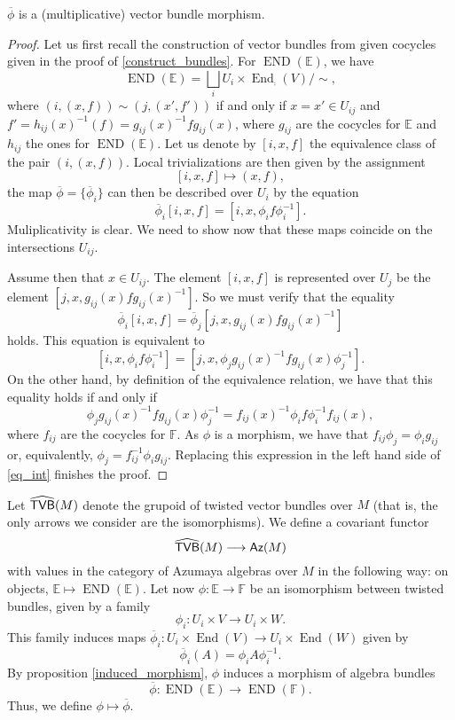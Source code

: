\begin{proposition}\label{induced_morphism}
$\overline{\phi}$ is a (multiplicative) vector bundle morphism.
\end{proposition}
\begin{proof}
Let us first recall the construction of vector bundles from given cocycles given in the proof of \ref{construct_bundles}. For $\operatorname{END}(\mathbb{E})$, we have
$$\operatorname{END}(\mathbb{E})=\bigsqcup_iU_i\times \operatorname{End}_{\comp}(V)/\sim ,$$
where $(i,(x,f))\sim (j,(x',f'))$ if and only if $x=x'\in U_{ij}$ and $f'=h_{ij}(x)^{-1}(f)=g_{ij}(x)^{-1}fg_{ij}(x)$, where $g_{ij}$ are the cocycles for $\mathbb{E}$ and $h_{ij}$ the ones for $\operatorname{END}(\mathbb{E})$. Let us denote by $[i,x,f]$ the equivalence class of the pair $(i,(x,f))$. Local trivializations are then given by the assignment
$$[i,x,f]\longmapsto (x,f),$$
the map $\overline{\phi}=\{\overline{\phi}_i\}$ can then be described over $U_i$ by the equation
$$\overline{\phi}_i[i,x,f]=[i,x,\phi_i f\phi_i^{-1}].$$
Muliplicativity is clear. We need to show now that these maps coincide on the intersections $U_{ij}$.

Assume then that $x\in U_{ij}$. The element $[i,x,f]$ is represented over $U_j$ be the element $[j,x,g_{ij}(x)fg_{ij}(x)^{-1}]$. So we must verify that the equality
$$
\overline{\phi}_i[i,x,f]=\overline{\phi}_j[j,x,g_{ij}(x)fg_{ij}(x)^{-1}]
$$
holds. This equation is equivalent to
$$
[i,x,\phi_if\phi_i^{-1}]=[j,x,\phi_jg_{ij}(x)^{-1}fg_{ij}(x)\phi_j^{-1}].
$$
On the other hand, by definition of the equivalence relation, we have that this equality holds if and only if
\begin{equation}\label{eq_int}
\phi_jg_{ij}(x)^{-1}fg_{ij}(x)\phi_j^{-1} = f_{ij}(x)^{-1}\phi_if\phi_i^{-1}f_{ij}(x),
\end{equation}
where $f_{ij}$ are the cocycles for $\mathbb{F}$. As $\phi$ is a morphism, we have that $f_{ij}\phi_j=\phi_ig_{ij}$ or, equivalently, $\phi_j=f_{ij}^{-1}\phi_ig_{ij}$. Replacing this expression in the left hand side of \eqref{eq_int} finishes the proof.
\end{proof}

Let $\widehat{\mathsf{TVB}}(M)$ denote the grupoid of twisted vector bundles over $M$ (that is, the only arrows we consider are the isomorphisms). We define a covariant functor
\begin{equation}\label{functor_tvb_az}
\widehat{\mathsf{TVB}}(M)\longrightarrow \mathsf{Az}(M)
\end{equation}
with values in the category of Azumaya algebras over $M$ in the following way: on objects, $\mathbb{E}\mapsto \operatorname{END}(\mathbb{E})$. Let now $\phi :\mathbb{E}\to \mathbb{F}$ be an isomorphism between twisted bundles, given by a family
$$\phi_i:U_i\times V\longrightarrow U_i\times W.$$
This family induces maps $\overline{\phi}_i:U_i\times \operatorname{End}(V)\to U_i\times \operatorname{End}(W)$ given by
$$\overline{\phi}_i(A)=\phi_iA\phi_i^{-1}.$$
By proposition \ref{induced_morphism}, $\phi$ induces a morphism of algebra bundles
$$\overline{\phi}:\operatorname{END}(\mathbb{E})\longrightarrow \operatorname{END}(\mathbb{F}).$$
Thus, we define $\phi \mapsto \overline{\phi}$.

